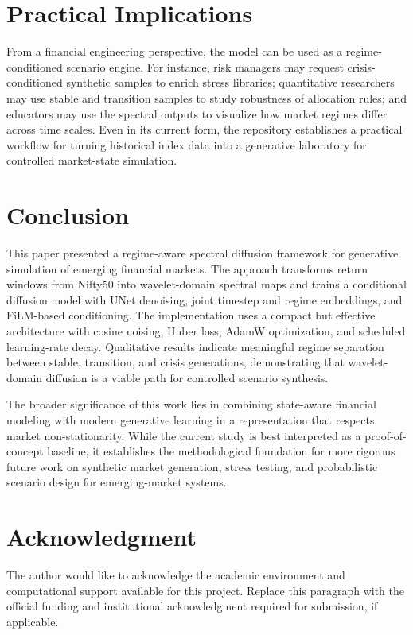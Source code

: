 \documentclass[conference]{IEEEtran}
\begin{document}
\section{Practical Implications}
From a financial engineering perspective, the model can be used as a regime-conditioned scenario engine. For instance, risk managers may request crisis-conditioned synthetic samples to enrich stress libraries; quantitative researchers may use stable and transition samples to study robustness of allocation rules; and educators may use the spectral outputs to visualize how market regimes differ across time scales. Even in its current form, the repository establishes a practical workflow for turning historical index data into a generative laboratory for controlled market-state simulation.

\section{Conclusion}
This paper presented a regime-aware spectral diffusion framework for generative simulation of emerging financial markets. The approach transforms return windows from Nifty50 into wavelet-domain spectral maps and trains a conditional diffusion model with UNet denoising, joint timestep and regime embeddings, and FiLM-based conditioning. The implementation uses a compact but effective architecture with cosine noising, Huber loss, AdamW optimization, and scheduled learning-rate decay. Qualitative results indicate meaningful regime separation between stable, transition, and crisis generations, demonstrating that wavelet-domain diffusion is a viable path for controlled scenario synthesis.

The broader significance of this work lies in combining state-aware financial modeling with modern generative learning in a representation that respects market non-stationarity. While the current study is best interpreted as a proof-of-concept baseline, it establishes the methodological foundation for more rigorous future work on synthetic market generation, stress testing, and probabilistic scenario design for emerging-market systems.

\section*{Acknowledgment}
The author would like to acknowledge the academic environment and computational support available for this project. Replace this paragraph with the official funding and institutional acknowledgment required for submission, if applicable.
\end{document}
